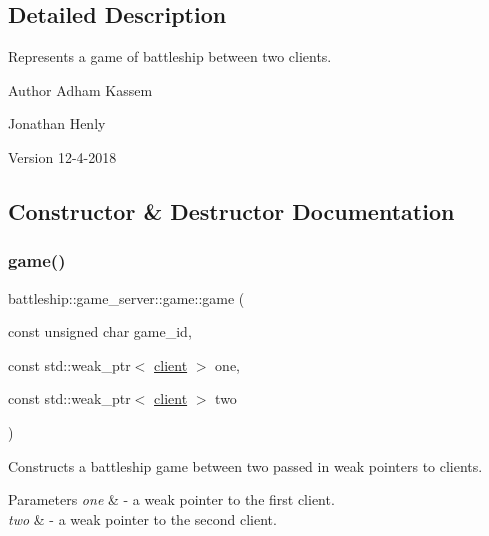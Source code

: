 \subsection{Detailed Description}
Represents a game of battleship between two clients. 

\begin{DoxyAuthor}{Author}
Adham Kassem 

Jonathan Henly 
\end{DoxyAuthor}
\begin{DoxyVersion}{Version}
12-\/4-\/2018 
\end{DoxyVersion}


\subsection{Constructor \& Destructor Documentation}
\mbox{\label{classbattleship_1_1game__server_1_1game_a17582f2a51f16538e3bc2a821676e153}} 
\subsubsection{\texorpdfstring{game()}{game()}}
{\footnotesize\ttfamily battleship\+::game\+\_\+server\+::game\+::game (\begin{DoxyParamCaption}\item[{const unsigned char}]{game\+\_\+id,  }\item[{const std\+::weak\+\_\+ptr$<$ \hyperlink{classbattleship_1_1game__server_1_1client}{client} $>$}]{one,  }\item[{const std\+::weak\+\_\+ptr$<$ \hyperlink{classbattleship_1_1game__server_1_1client}{client} $>$}]{two }\end{DoxyParamCaption})\hspace{0.3cm}{\ttfamily [inline]}}

Constructs a battleship game between two passed in weak pointers to clients.


\begin{DoxyParams}{Parameters}
{\em one} & -\/ a weak pointer to the first client. \\
\hline
{\em two} & -\/ a weak pointer to the second client. \\
\hline
\end{DoxyParams}
\mbox{\label{classbattleship_1_1game__server_1_1game_a49674bd20bc7bf09660a2aaa0287c5e6}} 
